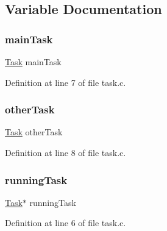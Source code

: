 \subsection{Variable Documentation}
\mbox{\label{a00047_a228ac88416ebaa8713846e3e5e3e9b6d_a228ac88416ebaa8713846e3e5e3e9b6d}} 
\subsubsection{\texorpdfstring{main\+Task}{mainTask}}
{\footnotesize\ttfamily \hyperlink{a00136}{Task} main\+Task\hspace{0.3cm}{\ttfamily [static]}}



Definition at line 7 of file task.\+c.

\mbox{\label{a00047_ab0e87ab98b8b029839a398838d16e1f0_ab0e87ab98b8b029839a398838d16e1f0}} 
\subsubsection{\texorpdfstring{other\+Task}{otherTask}}
{\footnotesize\ttfamily \hyperlink{a00136}{Task} other\+Task\hspace{0.3cm}{\ttfamily [static]}}



Definition at line 8 of file task.\+c.

\mbox{\label{a00047_a2c195d425b4a6791b3a89f7b219f93d9_a2c195d425b4a6791b3a89f7b219f93d9}} 
\subsubsection{\texorpdfstring{running\+Task}{runningTask}}
{\footnotesize\ttfamily \hyperlink{a00136}{Task}$\ast$ running\+Task\hspace{0.3cm}{\ttfamily [static]}}



Definition at line 6 of file task.\+c.

